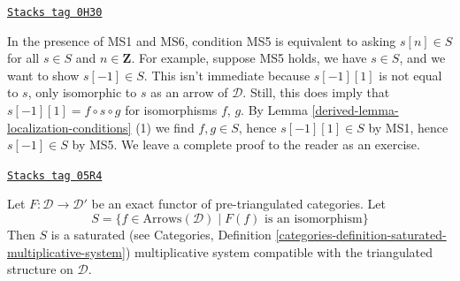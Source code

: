 \begin{remark}[MS5]
\label{derived-remark-MS5}
\href{https://stacks.math.columbia.edu/tag/0H30}{\texttt{Stacks tag 0H30}}

In the presence of MS1 and MS6, condition MS5 is equivalent to asking
$s[n] \in S$ for all $s \in S$ and $n \in \mathbf{Z}$. For example,
suppose MS5 holds, we have $s \in S$, and we want to show $s[-1] \in S$.
This isn't immediate because $s[-1][1]$ is not equal to $s$, only
isomorphic to $s$ as an arrow of $\mathcal{D}$. Still, this does imply that
$s[-1][1] = f \circ s \circ g$ for isomorphisms $f$, $g$. By
Lemma \ref{derived-lemma-localization-conditions} (1) we find $f, g \in S$,
hence $s[-1][1] \in S$ by MS1, hence $s[-1] \in S$ by MS5.
We leave a complete proof to the reader as an exercise.
\end{remark}

\begin{lemma}
\label{derived-lemma-triangle-functor-localize}
\href{https://stacks.math.columbia.edu/tag/05R4}{\texttt{Stacks tag 05R4}}

Let $F : \mathcal{D} \to \mathcal{D}'$ be an exact functor of
pre-triangulated categories.  Let
$$
S = \{f \in \text{Arrows}(\mathcal{D})
\mid F(f)\text{ is an isomorphism}\}
$$
Then $S$ is a saturated (see
Categories,
Definition \ref{categories-definition-saturated-multiplicative-system})
multiplicative system compatible with the
triangulated structure on $\mathcal{D}$.
\end{lemma}

